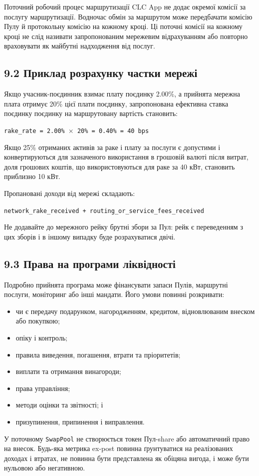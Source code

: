 \documentclass[11pt]{article}
\begin{document}
Поточний робочий процес маршрутизації CLC App не додає окремої комісії за послугу маршрутизації. Водночас обмін за маршрутом може передбачати комісію Пулу й протокольну комісію на кожному кроці. Ці поточні комісії на кожному кроці не слід називати запропонованим мережевим відрахуванням або повторно враховувати як майбутні надходження від послуг.

\subsection*{9.2 Приклад розрахунку частки мережі}

Якщо учасник-поєдинник взимає плату поєдинку 2.00\%, а прийнята мережна плата отримує 20\% цієї плати поєдинку, запропонована ефективна ставка поєдинку поєдинку на маршрутовану вартість становить:

\texttt{rake\_rate = 2.00\% $\times$ 20\% = 0.40\% = 40 bps}

Якщо 25\% отриманих активів за раке і плату за послуги є допустими і конвертируються для зазначеного використання в грошовій валюті після витрат, доля грошових коштів, що використовуються для раке за 40 кВт, становить приблизно 10 кВт.

Пропановані доходи від мережі складають:

\texttt{network\_rake\_received + routing\_or\_service\_fees\_received}

Не додавайте до мережного рейку брутні збори за Пул: рейк є переведенням з цих зборів і в іншому випадку буде розрахуватися двічі.

\subsection*{9.3 Права на програми ліквідності}

Подробно прийнята програма може фінансувати запаси Пулів, маршрутні послуги, моніторинг або інші мандати. Його умови повинні розкривати:

\begin{itemize}[leftmargin=*]
\item чи є передачу подарунком, нагородженням, кредитом, відновлюваним внеском або покупкою;
\item опіку і контроль;
\item правила виведення, погашення, втрати та пріоритетів;
\item виплати та отримання винагороди;
\item права управління;
\item методи оцінки та звітності; і
\item призупинення, припинення і виправлення.
\end{itemize}
У поточному \texttt{SwapPool} не створюється токен Пул-share або автоматичний право на внесок. Будь-яка метрика ex-post повинна ґрунтуватися на реалізованих доходах і втратах, не повинна бути представлена як обіцяна вигода, і може бути нульовою або негативною.
\end{document}
